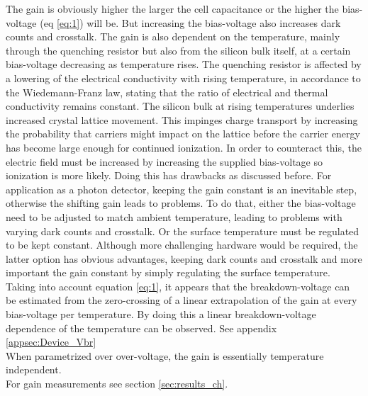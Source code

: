 \documentclass[12pt,article,type=msc,colorback,accentcolor=tud9c]{tudthesis}
\begin{document}
The gain is obviously higher the larger the cell capacitance or the higher the bias-voltage (eq \ref{eq:1}) will be. But increasing the bias-voltage also increases dark counts and crosstalk. 
The gain is also dependent on the temperature, mainly through the quenching resistor but also from the silicon bulk itself, at a certain bias-voltage decreasing as temperature rises. The quenching resistor is affected by a lowering of the electrical conductivity with rising temperature, in accordance to the Wiedemann-Franz law, stating that the ratio of electrical and thermal conductivity remains constant. The silicon bulk at rising temperatures underlies increased crystal lattice movement. This impinges charge transport by increasing the probability that carriers might impact on the lattice before the carrier energy has become large enough for continued ionization. In order to counteract this, the electric field must be increased by increasing the supplied bias-voltage so ionization is more likely. Doing this has drawbacks as discussed before. For application as a photon detector, keeping the gain constant is an inevitable step, otherwise the shifting gain leads to problems. To do that, either the bias-voltage need to be adjusted to match ambient temperature, leading to problems with varying dark counts and crosstalk. Or the surface temperature must be regulated to be kept constant. Although more challenging hardware would be required, the latter option has obvious advantages, keeping dark counts and crosstalk and more important the gain constant by simply regulating the surface temperature.\\
Taking into account equation \ref{eq:1}, it appears that the breakdown-voltage can be estimated from the zero-crossing of a linear extrapolation of the gain at every bias-voltage per temperature. By doing this a linear breakdown-voltage dependence of the temperature can be observed. See appendix {\ref{appsec:Device_Vbr}}\\
When parametrized over over-voltage, the gain is essentially temperature independent.\\
For gain measurements see section {\ref{sec:results_ch}}.
\end{document}
